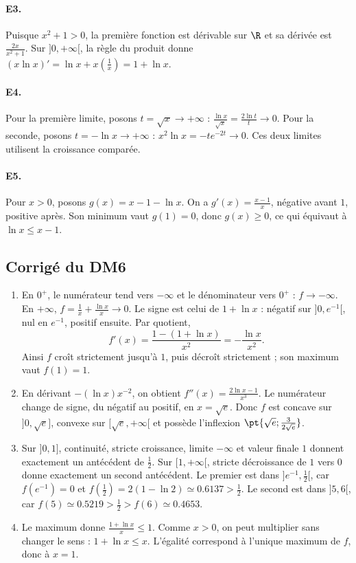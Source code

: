 \paragraph{E3.}Puisque $x^2+1>0$, la première fonction est dérivable sur $\R$ et sa dérivée est $\frac{2x}{x^2+1}$. Sur $]0,+\infty[$, la règle du produit donne $(x\ln x)'=\ln x+x(\frac{1}{x})=1+\ln x$.

\paragraph{E4.}Pour la première limite, posons $t=\sqrt x\to+\infty$ : $\frac{\ln x}{\sqrt{x}}=\frac{2\ln t}{t}\to0$. Pour la seconde, posons $t=-\ln x\to+\infty$ : $x^2\ln x=-te^{-2t}\to0$. Ces deux limites utilisent la croissance comparée.

\paragraph{E5.}Pour $x>0$, posons $g(x)=x-1-\ln x$. On a $g'(x)=\frac{x-1}{x}$, négative avant $1$, positive après. Son minimum vaut $g(1)=0$, donc $g(x)\ge0$, ce qui équivaut à $\ln x\le x-1$.

\subsection{Corrigé du DM6}\begin{enumerate}
\item En $0^+$, le numérateur tend vers $-\infty$ et le dénominateur vers $0^+$ : $f\to-\infty$. En $+\infty$, $f=\frac{1}{x}+\frac{\ln x}{x}\to0$. Le signe est celui de $1+\ln x$ : négatif sur $]0,e^{-1}[$, nul en $e^{-1}$, positif ensuite. Par quotient,
\[f'(x)=\frac{1-(1+\ln x)}{x^2}=-\frac{\ln x}{x^2}.\]
Ainsi $f$ croît strictement jusqu'à $1$, puis décroît strictement ; son maximum vaut $f(1)=1$.
\item En dérivant $-(\ln x)x^{-2}$, on obtient $f''(x)=\frac{2\ln x-1}{x^3}$. Le numérateur change de signe, du négatif au positif, en $x=\sqrt e$. Donc $f$ est concave sur $]0,\sqrt e]$, convexe sur $[\sqrt e,+\infty[$ et possède l'inflexion $\pt{\sqrt{e};\frac{3}{2\sqrt e}}$.
\item Sur $]0,1]$, continuité, stricte croissance, limite $-\infty$ et valeur finale $1$ donnent exactement un antécédent de $\frac{1}{2}$. Sur $[1,+\infty[$, stricte décroissance de $1$ vers $0$ donne exactement un second antécédent. Le premier est dans $]e^{-1},\frac{1}{2}[$, car $f(e^{-1})=0$ et $f(\frac{1}{2})=2(1-\ln2)\simeq\num{0,6137}>\frac{1}{2}$. Le second est dans $]5,6[$, car $f(5)\simeq\num{0,5219}>\frac{1}{2}>f(6)\simeq\num{0,4653}$.
\item Le maximum donne $\frac{1+\ln x}{x}\le1$. Comme $x>0$, on peut multiplier sans changer le sens : $1+\ln x\le x$. L'égalité correspond à l'unique maximum de $f$, donc à $x=1$.
\end{enumerate}

